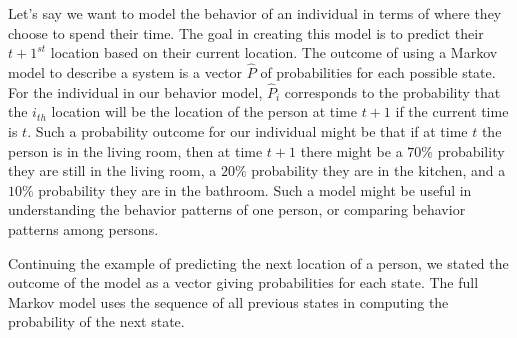 Let's say we want to model the behavior
of an individual in terms of where 
they choose to spend their time.
The goal in creating
this model is to predict their $t+1^{st}$ location
based on their current location.
%
The outcome of using a Markov model to describe a system
is a vector $\hat{P}$ of probabilities for each possible state.
For the individual in our behavior model,
$\hat{P}_i$ corresponds to the probability that the $i_{th}$ location
will be the location of the person at time $t+1$ if the current time is $t$.
%
Such a probability outcome for our individual might be
that if at time $t$ the person is in the living room,
then at time $t+1$ there might be 
a $70\%$ probability they are still in the living room,
a $20\%$ probability they are in the kitchen, and
a $10\%$ probability they are in the bathroom.
%
Such a model might be useful in understanding 
the behavior patterns of one person, or
comparing behavior patterns among persons.

Continuing the example of predicting
the next location of a person,
we stated the outcome of the model as a vector
giving probabilities for each state.
The full Markov model uses the sequence of all previous states
in computing the probability of the next state.
%
%

